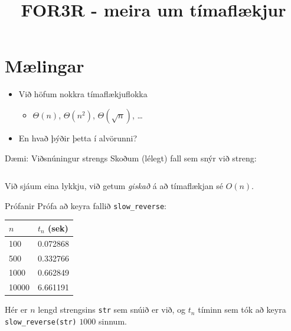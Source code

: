 \documentclass{beamer}
\title{FOR3R - meira um tímaflækjur}
\begin{document}
\section{Mælingar}

\begin{frame}
\titlepage
\end{frame}

\begin{frame}
\begin{itemize}
 \item Við höfum nokkra tímaflækjuflokka
 \begin{itemize}
  \item $\Theta(n)$, $\Theta(n^2)$, $\Theta(\sqrt{n})$, \ldots
 \end{itemize}
 \item En hvað þýðir þetta í alvörunni?
\end{itemize}
\end{frame}

\begin{frame}[fragile]{Dæmi: Viðsnúningur strengs}
Skoðum (lélegt) fall sem snýr við streng:

\inputminted{python}{Code/Python/slow_reverse.py}

Við sjáum eina lykkju, við getum \emph{giskað} á að tímaflækjan sé $O(n)$.
\end{frame}

\begin{frame}{Prófanir}
Prófa að keyra fallið \texttt{slow\_reverse}:
\begin{center}
\begin{tabular}{ll}
\toprule
$n$&$t_n$ (sek)\\
\midrule
100&0.072868\\
500&0.332766\\
1000&0.662849\\
10000&6.661191\\
\bottomrule
\end{tabular}
\end{center}
Hér er $n$ lengd strengsins \texttt{str} sem snúið er við, og $t_n$ tíminn sem tók að keyra \texttt{slow\_reverse(str)} $1000$ sinnum.
\end{frame}
\end{document}
